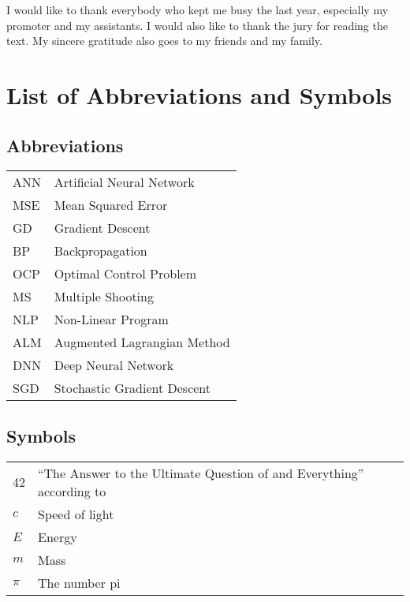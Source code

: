 \documentclass[master=wit,english]{kulemt}
\begin{document}
\begin{preface}
  I would like to thank everybody who kept me busy the last year,
  especially my promoter and my assistants. I would also like to thank the
  jury for reading the text. My sincere gratitude also goes to my friends and my family.
\end{preface}

\tableofcontents*

\begin{abstract}


\end{abstract}

\chapter{List of Abbreviations and Symbols}
\section*{Abbreviations}
\begin{flushleft}
  \renewcommand{\arraystretch}{1.1}
  \begin{tabularx}{\textwidth}{@{}p{12mm}X@{}}
  	ANN & Artificial Neural Network \\
  	MSE & Mean Squared Error \\
  	GD & Gradient Descent \\
  	BP & Backpropagation \\
  	OCP & Optimal Control Problem \\
  	MS & Multiple Shooting \\
  	NLP & Non-Linear Program \\
  	ALM & Augmented Lagrangian Method \\
  	DNN & Deep Neural Network \\
  	SGD & Stochastic Gradient Descent
  \end{tabularx}
\end{flushleft}
\section*{Symbols}
\begin{flushleft}
  \renewcommand{\arraystretch}{1.1}
  \begin{tabularx}{\textwidth}{@{}p{12mm}X@{}}
    42    & ``The Answer to the Ultimate Question of %
            and Everything'' according to \cite{h2g2} \\
    $c$   & Speed of light \\
    $E$   & Energy \\
    $m$   & Mass \\
    $\pi$ & The number pi \\
  \end{tabularx}
\end{flushleft}
\end{document}
